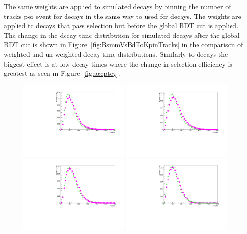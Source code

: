 The same weights are applied to simulated \bsmumu decays by binning the number of tracks per event for \bsmumu decays in the same way to used for \bdkpi decays. The weights are applied to decays that pass selection but before the global BDT cut is applied. The change in the decay time distribution for \bsmuu simulated decays after the global BDT cut is shown in Figure~\ref{fig:BsmmVsBdToKpinTracks} in the comparison of weighted and un-weighted \bsmumu decay time distributions. Similarly to \bdkpi decays the biggest effect is at low decay times where the change in selection efficiency is greatest as seen in Figure~\ref{fig:accpteg}.
\begin{figure}[htbp]
  \centering
    \includegraphics[width=0.49\textwidth]{./Figs/LifetimeMeasurement/nTracks_2011_Bd2KPi_Bs2MuMu_Dec_triggers.pdf}
    \includegraphics[width=0.49\textwidth]{./Figs/LifetimeMeasurement/nTracks_2012_Bd2KPi_Bs2MuMu_Dec_triggers.pdf}
    \includegraphics[width=0.49\textwidth]{./Figs/LifetimeMeasurement/nTracks_2015_Bd2KPi_Bs2MuMu_Dec_triggers.pdf}
    \includegraphics[width=0.49\textwidth]{./Figs/LifetimeMeasurement/nTracks_2016_Bd2KPi_Bs2MuMu_Dec_triggers.pdf}

\end{figure}

